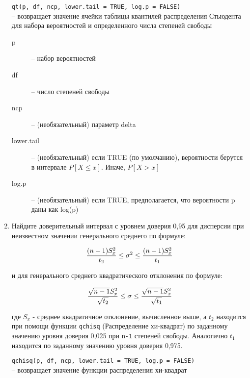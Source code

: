 \begin{enumerate}
          \begin{mdframed}[style=BadassFrame]

              \texttt{qt(p, df, ncp, lower.tail = TRUE, log.p = FALSE)} \\ 
                -- возвращает значение ячейки таблицы квантилей распределения Стьюдента для набора 
                вероятностей и определенного числа степеней свободы
              \begin{description}

                \item[p] -- набор вероятностей
                \item[df] -- число степеней свободы
                \item[ncp] -- (необязательный) параметр delta
                \item[lower.tail] -- (необязательный) если TRUE (по умолчанию), вероятности берутся в интервале $P[X \leq x]$. Иначе, $P[X > x]$ 
                \item[log.p] -- (необязательный) если TRUE, предполагается, что вероятности p даны как log(p)
              \end{description}
        \end{mdframed}


    \item Найдите доверительный интервал с уровнем доверия 0,95 для дисперсии при неизвестном значении генерального
          среднего по формуле:

          $$ {(n-1)S_x^2 \over t_2} \leq \sigma^2 \leq {(n-1)S_x^2 \over t_1} $$ 

          и для генерального среднего квадратического отклонения по формуле:

          $$ {\sqrt{n-1}S_x^2 \over \sqrt{t_2}} \leq \sigma \leq {\sqrt{n-1}S_x^2 \over \sqrt{t_1}} $$

          где $ S_x $ - среднее квадратичное отклонение, вычисленное выше, а $ t_2 $ находится при помощи
          функции \texttt{qchisq} (Распределение хи-квадрат) по заданному значению уровня доверия 0,025 при \texttt{n-1} степеней свободы.
          Аналогично $ t_1 $ находится по заданному значению уровня доверия 0,975.

          \begin{mdframed}[style=BadassFrame]

              \texttt{qchisq(p, df, ncp, lower.tail = TRUE, log.p = FALSE)} \\ -- возвращает значение функции распределения хи-квадрат
              \begin{description}


\end{description}
\end{mdframed}
\end{enumerate}
